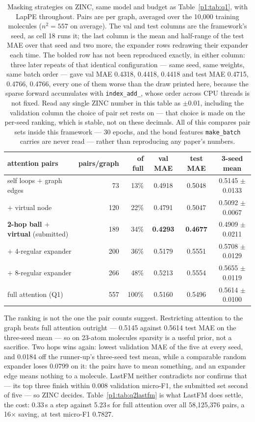 \begin{table}[H]
\centering
\caption{Masking strategies on ZINC, same model and budget as Table~\ref{p1:tab:q1}, with LapPE throughout. Pairs are per graph, averaged over the 10{,}000 training molecules ($n^2 = 557$ on average). The val and test columns are the framework's seed, as cell 18 runs it; the last column is the mean and half-range of the test MAE over that seed and two more, the expander rows redrawing their expander each time. The bolded row has not been reproduced exactly, in either column: three later repeats of that identical configuration --- same seed, same weights, same batch order --- gave val MAE 0.4318, 0.4418, 0.4418 and test MAE 0.4715, 0.4766, 0.4766, every one of them worse than the draw printed here, because the sparse forward accumulates with \texttt{index\_add\_}, whose order across CPU threads is not fixed. Read any single ZINC number in this table as $\pm$0.01, including the validation column the choice of pair set rests on --- that choice is made on the per-seed ranking, which is stable, not on these decimals. All of this compares pair sets inside this framework --- 30 epochs, and the bond features \texttt{make\_batch} carries are never read --- rather than reproducing any paper's numbers.}
\label{p1:tab:q2}
\small
\begin{tabular}{lrrccc}
\toprule
attention pairs & pairs/graph & of full & val MAE & test MAE & 3-seed mean \\
\midrule
self loops $+$ graph edges & 73 & 13\% & 0.4918 & 0.5048 & 0.5145 $\pm$ 0.0133 \\
$+$ virtual node & 120 & 22\% & 0.4791 & 0.5047 & 0.5092 $\pm$ 0.0067 \\
\textbf{2-hop ball $+$ virtual} (submitted) & 189 & 34\% & \textbf{0.4293} & \textbf{0.4677} & 0.4909 $\pm$ 0.0211 \\
$+$ 4-regular expander & 200 & 36\% & 0.5179 & 0.5551 & 0.5708 $\pm$ 0.0129 \\
$+$ 8-regular expander & 266 & 48\% & 0.5213 & 0.5554 & 0.5655 $\pm$ 0.0119 \\
\midrule
full attention (Q1) & 557 & 100\% & 0.5160 & 0.5496 & 0.5614 $\pm$ 0.0100 \\
\bottomrule
\end{tabular}
\end{table}

The ranking is not the one the pair counts suggest. Restricting attention to the graph beats full attention outright --- 0.5145 against 0.5614 test MAE on the three-seed mean --- so on 23-atom molecules sparsity is a useful prior, not a sacrifice. Two hops wins again: lowest validation MAE of the five at every seed, and 0.0184 off the runner-up's three-seed test mean, while a comparable random expander loses 0.0799 on it: the pairs have to mean something, and an expander edge means nothing to a molecule. LastFM neither contradicts nor confirms that --- its top three finish within 0.008 validation micro-F1, the submitted set second of five --- so ZINC decides. Table~\ref{p1:tab:q2lastfm} is what LastFM does settle, the cost: 0.33\,s a step against 5.23\,s for full attention over all 58{,}125{,}376 pairs, a 16$\times$ saving, at test micro-F1 0.7827.


